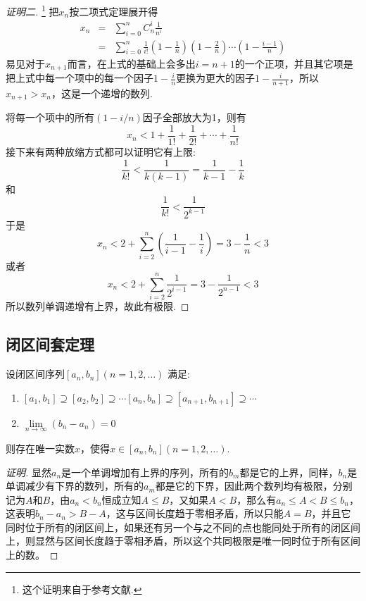 \begin{proof}[证明二]\footnote{这个证明来自于参考文献\cite{math-analysis}.}
  把$x_n$按二项式定理展开得
  \begin{eqnarray*}
    x_n & = & \sum_{i=0}^n C_n^i \frac{1}{n^i} \\
    & = & \sum_{i=0}^n \frac{1}{i!}\left( 1-\frac{1}{n} \right) \left( 1-\frac{2}{n} \right)\cdots \left( 1-\frac{i-1}{n} \right)
  \end{eqnarray*}
  易见对于$x_{n+1}$而言，在上式的基础上会多出$i=n+1$的一个正项，并且其它项是把上式中每一个项中的每一个因子$1-\frac{i}{n}$更换为更大的因子$1-\frac{i}{n+1}$，所以$x_{n+1}>x_n$，这是一个递增的数列.

  将每一个项中的所有$(1-i/n)$因子全部放大为1，则有
  \[  x_n < 1+\frac{1}{1!}+\frac{1}{2!}+\cdots+\frac{1}{n!} \]
  接下来有两种放缩方式都可以证明它有上限:
  \[ \frac{1}{k!} < \frac{1}{k(k-1)} = \frac{1}{k-1} - \frac{1}{k} \]
  和
  \[ \frac{1}{k!} < \frac{1}{2^{k-1}} \]
  于是
  \[ x_n < 2 + \sum_{i=2}^n \left( \frac{1}{i-1}-\frac{1}{i} \right) = 3-\frac{1}{n} < 3 \]
  或者
  \[ x_n < 2 + \sum_{i=2}^n \frac{1}{2^{i-1}} = 3-\frac{1}{2^{n-1}} < 3 \]
  所以数列单调递增有上界，故此有极限.
\end{proof}



\subsection{闭区间套定理}
\label{sec:theorem-of-closed-interval-sequence}

\begin{theorem}[闭区间套定理]
  \label{closed-interval-sequence-theorem}
  设闭区间序列$[a_n,b_n](n=1,2,\ldots)$ 满足:
  \begin{enumerate}
  \item $[a_1,b_1] \supseteq [a_2,b_2] \supseteq \cdots [a_n,b_n] \supseteq [a_{n+1},b_{n+1}] \supseteq \cdots$
  \item $\lim\limits_{n \to \infty} (b_n-a_n) = 0$
  \end{enumerate}
    则存在唯一实数$x$，使得$x \in [a_n,b_n](n=1,2,\ldots)$.
\end{theorem}

\begin{proof}[证明]
  显然$a_n$是一个单调增加有上界的序列，所有的$b_m$都是它的上界，同样，$b_n$是单调减少有下界的数列，所有的$a_m$都是它的下界，因此两个数列均有极限，分别记为$A$和$B$，由$a_n < b_n$恒成立知$A \leqslant B$，又如果$A<B$，那么有$a_n\leqslant A < B \leqslant b_n$，这表明$b_n-a_n>B-A$，这与区间长度趋于零相矛盾，所以只能$A=B$，并且它同时位于所有的闭区间上，如果还有另一个与之不同的点也能同处于所有的闭区间上，则显然与区间长度趋于零相矛盾，所以这个共同极限是唯一同时位于所有区间上的数。
\end{proof}

